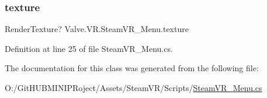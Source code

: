 \subsubsection{\texorpdfstring{texture}{texture}}
{\footnotesize\ttfamily Render\+Texture? Valve.\+V\+R.\+Steam\+V\+R\+\_\+\+Menu.\+texture\hspace{0.3cm}{\ttfamily [get]}}



Definition at line 25 of file Steam\+V\+R\+\_\+\+Menu.\+cs.



The documentation for this class was generated from the following file\+:\begin{DoxyCompactItemize}
\item 
O\+:/\+Git\+H\+U\+B\+M\+I\+N\+I\+P\+Roject/\+Assets/\+Steam\+V\+R/\+Scripts/\mbox{\hyperlink{_steam_v_r___menu_8cs}{Steam\+V\+R\+\_\+\+Menu.\+cs}}\end{DoxyCompactItemize}
